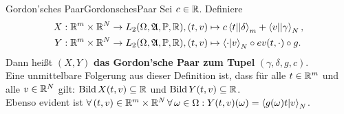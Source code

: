 \begin{definition}{Gordon'sches Paar}{GordonschesPaar}
Sei $c \in \mathbb{R}$. Definiere
\begin{align*}
X&: \mathbb{R}^m \times \mathbb{R}^N \rightarrow L_2(\Omega, \mathfrak{A}, \mathbb{P}, \mathbb{R}),
    (t, v) \mapsto c\left\langle t ||\delta\right\rangle _m + \left\langle v ||\gamma\right\rangle_N\text,\\
Y&: \mathbb{R}^m \times \mathbb{R}^N \rightarrow L_2(\Omega, \mathfrak{A}, \mathbb{P}, \mathbb{R}),
    (t, v) \mapsto \left\langle \cdot |v\right\rangle_N \circ ev(t, \cdot)\circ g\text.
\end{align*}
Dann heißt $(X, Y)$ \textbf{das Gordon'sche Paar zum Tupel}
$(\gamma, \delta, g, c)$.\\
Eine unmittelbare Folgerung aus dieser Definition ist, dass für alle
$t \in \mathbb{R}^m$ und alle $v \in \mathbb{R}^N$ gilt:
$\mathop{\textrm{Bild}}\nolimits X(t,v)\subseteq \mathbb{R}$ und $\mathop{\textrm{Bild}}\nolimits Y(t, v)\subseteq \mathbb{R}$.\\
Ebenso evident ist
$\forall\, (t, v) \in \mathbb{R}^m\times \mathbb{R}^N\, \forall\, \omega \in \Omega:
Y(t, v)(\omega) = \left\langle g(\omega)t |v\right\rangle_N$.
\end{definition}